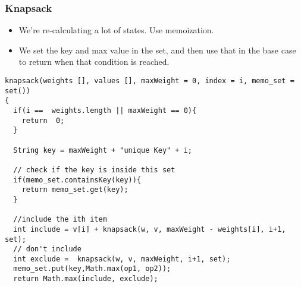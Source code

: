 \begin{frame}[fragile]
	\frametitle{Knapsack}
	

			\begin{itemize}
			\item We’re re-calculating a lot of states. Use memoization.
			\item We set the key and max value in the set, and then use that in the base case to return when that 
condition is reached. 
			\end{itemize}
			
\begin{lstlisting}
knapsack(weights [], values [], maxWeight = 0, index = i, memo_set = set()) 
{  
  if(i ==  weights.length || maxWeight == 0){ 
    return  0; 
  } 
 
  String key = maxWeight + "unique Key" + i; 
 
  // check if the key is inside this set 
  if(memo_set.containsKey(key)){ 
    return memo_set.get(key); 
  } 
 
  //include the ith item 
  int include = v[i] + knapsack(w, v, maxWeight - weights[i], i+1, set); 
  // don't include 
  int exclude =  knapsack(w, v, maxWeight, i+1, set); 
  memo_set.put(key,Math.max(op1, op2)); 
  return Math.max(include, exclude); 	
\end{lstlisting}			
		
		
\end{frame}
